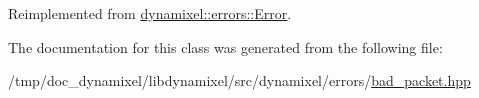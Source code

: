 Reimplemented from \hyperlink{classdynamixel_1_1errors_1_1_error_a12887a555c126d7e3a8ae8425730c8be}{dynamixel\+::errors\+::\+Error}.



The documentation for this class was generated from the following file\+:\begin{DoxyCompactItemize}
\item 
/tmp/doc\+\_\+dynamixel/libdynamixel/src/dynamixel/errors/\hyperlink{bad__packet_8hpp}{bad\+\_\+packet.\+hpp}\end{DoxyCompactItemize}

